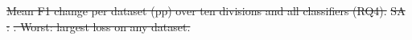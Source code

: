 \documentclass[conference]{IEEEtran}
\newcommand{\system}{\textsc{Synthagent}\xspace}
\newcommand{\best}[1]{\textbf{#1}}
\providecommand{\DIFdeltex}[1]{{\protect\color{red}\sout{#1}}}                      %
\providecommand{\DIFdelbegin}{} %
\providecommand{\DIFdelend}{} %
\providecommand{\DIFdelFL}[1]{\DIFdel{#1}} %
\providecommand{\DIFdel}[1]{\texorpdfstring{\DIFdeltex{#1}}{}} %
\newcommand{\DIFscaledelfig}{0.5}
\newlength{\DIFdelgraphicswidth} %
\newlength{\DIFdelgraphicsheight} %
\newcommand{\DIFdelincludegraphics}[2][]{%
\sbox{\DIFdelgraphicsbox}{\DIFOincludegraphics[#1]{#2}}%
\settoboxwidth{\DIFdelgraphicswidth}{\DIFdelgraphicsbox} %
\settoboxtotalheight{\DIFdelgraphicsheight}{\DIFdelgraphicsbox} %
\scalebox{\DIFscaledelfig}{%
\parbox[b]{\DIFdelgraphicswidth}{\usebox{\DIFdelgraphicsbox}\\[-\baselineskip] \rule{\DIFdelgraphicswidth}{0em}}\llap{\resizebox{\DIFdelgraphicswidth}{\DIFdelgraphicsheight}{%
\setlength{\unitlength}{\DIFdelgraphicswidth}%
\begin{picture}(1,1)%
\thicklines\linethickness{2pt} %
{\color[rgb]{1,0,0}\put(0,0){\framebox(1,1){}}}%
{\color[rgb]{1,0,0}\put(0,0){\line( 1,1){1}}}%
{\color[rgb]{1,0,0}\put(0,1){\line(1,-1){1}}}%
\end{picture}%
}\hspace*{3pt}}} %
} %
\DeclareRobustCommand{\DIFdelbegin}{\DIFOdelbegin \let\includegraphics\DIFdelincludegraphics} %
\DeclareRobustCommand{\DIFdelend}{\DIFOaddend \let\includegraphics\DIFOincludegraphics} %
\begin{document}
\DIFdelbegin %
{%
\DIFdelFL{Mean F1 change per dataset (pp) over ten divisions and all classifiers (RQ4). }\textsc{\DIFdelFL{SA}}%
\DIFdelFL{: }%
\DIFdelFL{. Worst: largest loss on any dataset.}}

\DIFdelend %
\end{document}
